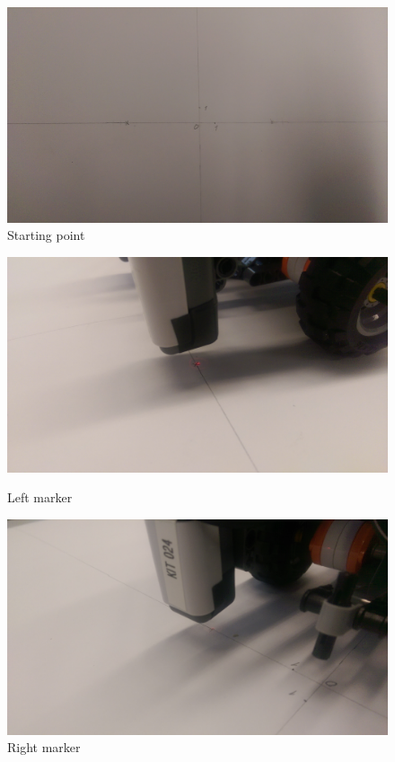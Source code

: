 \documentclass[a4paper, 12pt]{article}
\begin{document}
\begin{enumerate}
		\begin{figure}
			\centering
			\includegraphics[width=1\linewidth]{images/IMAG0144}
			\caption{Starting point}
			\label{fig:img2}
		\end{figure}
		
		\begin{figure}[!tbp]
			\centering
			\begin{minipage}[b]{1\textwidth}
				\includegraphics[width=1\linewidth]{images/IMAG0142}
				\caption{Left marker}
				\label{fig:img3}
			\end{minipage}
			\hfill
			\begin{minipage}[b]{1\textwidth}
				\includegraphics[width=1\linewidth]{images/IMAG0141}
				\caption{Right marker}
				\label{fig:img4}
			\end{minipage}
		\end{figure}
		

\end{enumerate}
\end{document}
